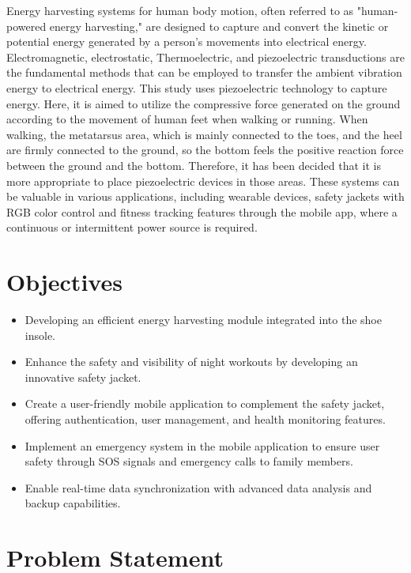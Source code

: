 \documentclass[11pt]{report}	%
\begin{document}
Energy harvesting systems for human body motion, often referred to as "human-powered energy harvesting," are designed to capture and convert the kinetic or potential energy generated by a person's movements into electrical energy. Electromagnetic, electrostatic, Thermoelectric, and piezoelectric transductions are the fundamental methods that can be employed to transfer the ambient vibration energy to electrical energy.  
This study uses piezoelectric technology to capture energy. Here, it is aimed to utilize the compressive force generated on the ground according to the movement of human feet when walking or running. When walking, the metatarsus area, which is mainly connected to the toes, and the heel are firmly connected to the ground, so the bottom feels the positive reaction force between the ground and the bottom. Therefore, it has been decided that it is more appropriate to place piezoelectric devices in those areas. 
These systems can be valuable in various applications, including wearable devices, safety jackets with RGB color control and fitness tracking features through the mobile app, where a continuous or intermittent power source is required.


\section{Objectives}
\begin{itemize}
  \item Developing an efficient energy harvesting module integrated into the shoe insole.
  \item Enhance the safety and visibility of night workouts by developing an innovative safety jacket.
  \item Create a user-friendly mobile application to complement the safety jacket, offering authentication, user management, and health monitoring features.
  \item Implement an emergency system in the mobile application to ensure user safety through SOS signals and emergency calls to family members.
  \item Enable real-time data synchronization with advanced data analysis and backup capabilities.
\end{itemize}


\section{Problem Statement }
\end{document}
